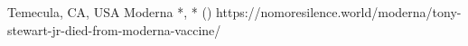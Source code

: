           {Temecula, CA, USA}
          {}
          {Moderna}
          {*, *}
          {
             ()
          }
          {https://nomoresilence.world/moderna/tony-stewart-jr-died-from-moderna-vaccine/}
